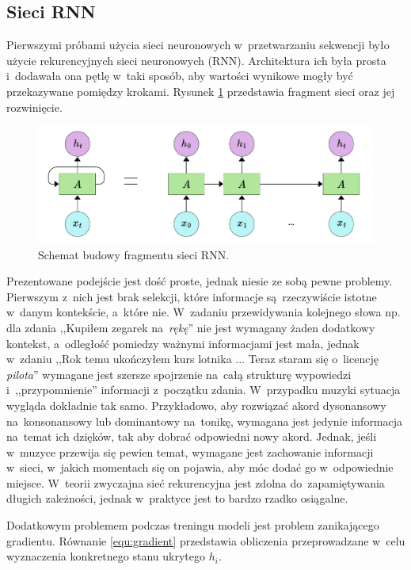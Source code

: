 \documentclass[data-science]{agh-wi} %
\begin{document}
\subsection{Sieci RNN}
Pierwszymi próbami użycia sieci neuronowych w~przetwarzaniu sekwencji było użycie rekurencyjnych sieci neuronowych (RNN). Architektura ich była prosta i~dodawała ona pętlę w~taki sposób, aby wartości wynikowe mogły być przekazywane pomiędzy krokami. Rysunek \ref*{fig:rnn_scheme} przedstawia fragment sieci oraz jej rozwinięcie.
\begin{figure}[ht!]
    \begin{center}
        \includegraphics[width=0.7\linewidth]{./img/new_rnn_scheme.pdf}
    \end{center}
    \caption{Schemat budowy fragmentu sieci RNN.}\label{fig:rnn_scheme}
\end{figure}

Prezentowane podejście jest dość proste, jednak niesie ze sobą pewne problemy. Pierwszym z~nich jest brak selekcji, które informacje są~rzeczywiście istotne w~danym kontekście, a~które nie. W~zadaniu przewidywania kolejnego słowa np. dla zdania ,,Kupiłem zegarek na~\textit{rękę}'' nie jest wymagany żaden dodatkowy kontekst, a~odległość pomiedzy ważnymi informacjami jest mała, jednak w~zdaniu ,,Rok temu ukończyłem kurs lotnika ... Teraz staram się o~licencję \textit{pilota}'' wymagane jest szersze spojrzenie na~całą strukturę wypowiedzi i~,,przypomnienie'' informacji z~początku zdania. W~przypadku muzyki sytuacja wygląda dokładnie tak samo. Przykładowo, aby rozwiązać akord dysonansowy na~konsonansowy lub dominantowy na~tonikę, wymagana jest jedynie informacja na~temat ich dzięków, tak aby dobrać odpowiedni nowy akord. Jednak, jeśli w~muzyce przewija się pewien temat, wymagane jest zachowanie informacji w~sieci, w~jakich momentach się on pojawia, aby móc dodać go w~odpowiednie miejsce. W~teorii zwyczajna sieć rekurencyjna jest zdolna do~zapamiętywania długich zależności, jednak w~praktyce jest to bardzo rzadko osiągalne.

Dodatkowym problemem podczas treningu modeli jest problem zanikającego gradientu. Równanie \ref*{equ:gradient} przedstawia obliczenia przeprowadzane w~celu wyznaczenia konkretnego stanu ukrytego $h_i$.
\end{document}
